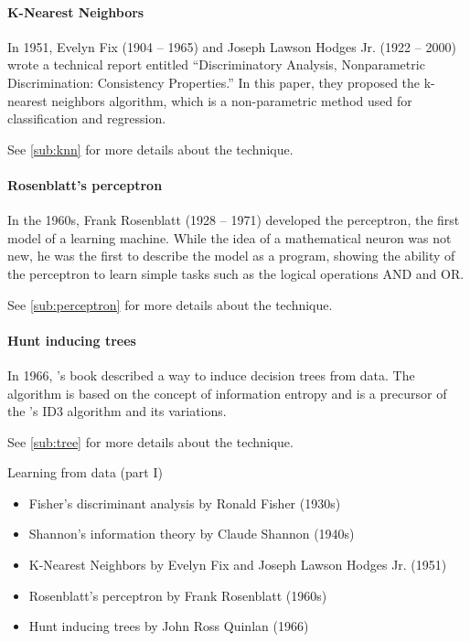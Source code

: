 \paragraph{K-Nearest Neighbors}

In 1951, Evelyn Fix (1904 -- 1965) and Joseph Lawson Hodges Jr. (1922 -- 2000) wrote a
technical report entitled ``Discriminatory Analysis, Nonparametric Discrimination:
Consistency Properties.''  In this paper, they proposed the k-nearest neighbors algorithm,
which is a non-parametric method used for classification and regression.

See \cref{sub:knn} for more details about the technique.

\paragraph{Rosenblatt's perceptron}

In the 1960s, Frank Rosenblatt (1928 -- 1971) developed the perceptron, the first model of
a learning machine.  While the idea of a mathematical neuron was not new, he was the first
to describe the model as a program, showing the ability of the perceptron to learn simple
tasks such as the logical operations AND and OR.

See \cref{sub:perceptron} for more details about the technique.

\paragraph{Hunt inducing trees}

In 1966, \citeauthor{Hunt1966}'s book described a way to induce decision trees from
data.  The algorithm is based on the concept of information entropy and is a precursor of
the \citeauthor{Quinlan1986}'s ID3 algorithm and its variations.

See \cref{sub:tree} for more details about the technique.

\begin{slidebox}{Learning from data (part I)}{}
  \begin{itemize}
    \item Fisher's discriminant analysis by Ronald Fisher (1930s)
    \item Shannon's information theory by Claude Shannon (1940s)
    \item K-Nearest Neighbors by Evelyn Fix and Joseph Lawson Hodges Jr. (1951)
    \item Rosenblatt's perceptron by Frank Rosenblatt (1960s)
    \item Hunt inducing trees by John Ross Quinlan (1966)
  \end{itemize}
\end{slidebox}

